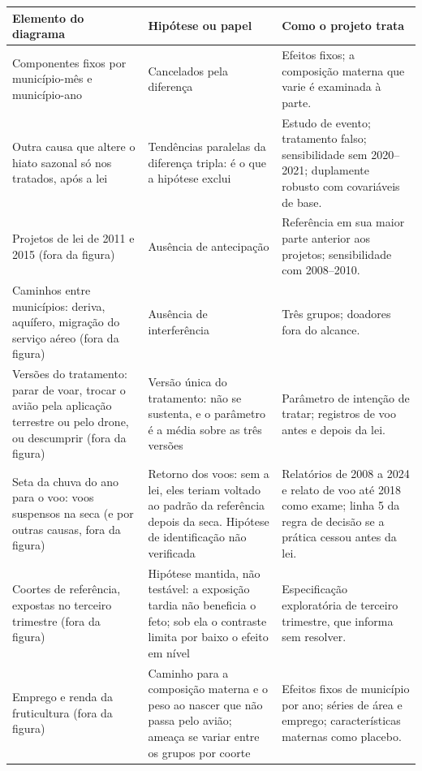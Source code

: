 \begin{apendicesenv}
\begin{quadro}[htb]
\caption{\label{qua:dag}Elementos da Figura~\ref{fig:dag} e hipóteses correspondentes}
\centering
\footnotesize
\begin{tabular}{@{}p{4.4cm}p{4.6cm}p{5.5cm}@{}}
\toprule
Elemento do diagrama & Hipótese ou papel & Como o projeto trata \\
\midrule
Componentes fixos por município-mês e município-ano &
Cancelados pela diferença &
Efeitos fixos; a composição materna que varie é examinada à parte. \\
Outra causa que altere o hiato sazonal só nos tratados, após a lei &
Tendências paralelas da diferença tripla: é o que a hipótese exclui &
Estudo de evento; tratamento falso; sensibilidade sem 2020--2021; duplamente robusto com covariáveis de base. \\
Projetos de lei de 2011 e 2015 (fora da figura) &
Ausência de antecipação &
Referência em sua maior parte anterior aos projetos; sensibilidade com 2008--2010. \\
Caminhos entre municípios: deriva, aquífero, migração do serviço aéreo (fora da figura) &
Ausência de interferência &
Três grupos; doadores fora do alcance. \\
Versões do tratamento: parar de voar, trocar o avião pela aplicação terrestre ou pelo drone, ou descumprir (fora da figura) &
Versão única do tratamento: não se sustenta, e o parâmetro é a média sobre as três versões &
Parâmetro de intenção de tratar; registros de voo antes e depois da lei. \\
Seta da chuva do ano para o voo: voos suspensos na seca (e por outras causas, fora da figura) &
Retorno dos voos: sem a lei, eles teriam voltado ao padrão da referência depois da seca. Hipótese de identificação não verificada &
Relatórios de 2008 a 2024 e relato de voo até 2018 como exame; linha 5 da regra de decisão se a prática cessou antes da lei. \\
Coortes de referência, expostas no terceiro trimestre (fora da figura) &
Hipótese mantida, não testável: a exposição tardia não beneficia o feto; sob ela o contraste limita por baixo o efeito em nível &
Especificação exploratória de terceiro trimestre, que informa sem resolver. \\
Emprego e renda da fruticultura (fora da figura) &
Caminho para a composição materna e o peso ao nascer que não passa pelo avião; ameaça se variar entre os grupos por coorte &
Efeitos fixos de município por ano; séries de área e emprego; características maternas como placebo. \\

\end{tabular}
\end{quadro}
\end{apendicesenv}
